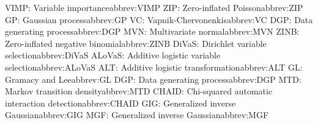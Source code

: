 \begin{tabbing}
\addabbrev VIMP: {\hspace{.4in}Variable importance}{abbrev:VIMP}
\addabbrev ZIP: {\hspace{.4in}Zero-inflated Poisson}{abbrev:ZIP}
\addabbrev GP: {\hspace{.4in}Gaussian process}{abbrev:GP}
\addabbrev VC: {\hspace{.4in}Vapnik-Chervonenkis}{abbrev:VC}
\addabbrev DGP: {\hspace{.4in}Data generating process}{abbrev:DGP}
\addabbrev MVN: {\hspace{.4in}Multivariate normal}{abbrev:MVN}
\addabbrev ZINB: {\hspace{.4in}Zero-inflated negative binomial}{abbrev:ZINB}
\addabbrev DiVaS: {\hspace{.4in}Dirichlet variable selection}{abbrev:DiVaS}
\addabbrev ALoVaS: {\hspace{.4in}Additive logistic variable selection}{abbrev:ALoVaS}
\addabbrev ALT: {\hspace{.4in}Additive logistic transformation}{abbrev:ALT}
\addabbrev GL: {\hspace{.4in}Gramacy and Lee}{abbrev:GL}
\addabbrev DGP: {\hspace{.4in}Data generating process}{abbrev:DGP}
\addabbrev MTD: {\hspace{.4in}Markov transition density}{abbrev:MTD}
\addabbrev CHAID: {\hspace{.4in}Chi-squared automatic interaction detection}{abbrev:CHAID}
\addabbrev GIG: {\hspace{.4in}Generalized inverse Gaussian}{abbrev:GIG}
\addabbrev MGF: {\hspace{.4in}Generalized inverse Gaussian}{abbrev:MGF}



\end{tabbing}